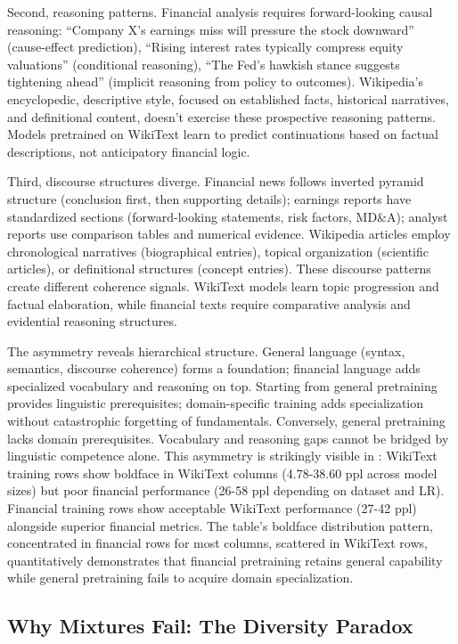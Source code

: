 Second, reasoning patterns. Financial analysis requires forward-looking causal reasoning: ``Company X's earnings miss will pressure the stock downward'' (cause-effect prediction), ``Rising interest rates typically compress equity valuations'' (conditional reasoning), ``The Fed's hawkish stance suggests tightening ahead'' (implicit reasoning from policy to outcomes). Wikipedia's encyclopedic, descriptive style, focused on established facts, historical narratives, and definitional content, doesn't exercise these prospective reasoning patterns. Models pretrained on WikiText learn to predict continuations based on factual descriptions, not anticipatory financial logic.

Third, discourse structures diverge. Financial news follows inverted pyramid structure (conclusion first, then supporting details); earnings reports have standardized sections (forward-looking statements, risk factors, MD\&A); analyst reports use comparison tables and numerical evidence. Wikipedia articles employ chronological narratives (biographical entries), topical organization (scientific articles), or definitional structures (concept entries). These discourse patterns create different coherence signals. WikiText models learn topic progression and factual elaboration, while financial texts require comparative analysis and evidential reasoning structures.

The asymmetry reveals hierarchical structure. General language (syntax, semantics, discourse coherence) forms a foundation; financial language adds specialized vocabulary and reasoning on top. Starting from general pretraining provides linguistic prerequisites; domain-specific training adds specialization without catastrophic forgetting of fundamentals. Conversely, general pretraining lacks domain prerequisites. Vocabulary and reasoning gaps cannot be bridged by linguistic competence alone. This asymmetry is strikingly visible in : WikiText training rows show boldface in WikiText columns (4.78-38.60 ppl across model sizes) but poor financial performance (26-58 ppl depending on dataset and LR). Financial training rows show acceptable WikiText performance (27-42 ppl) alongside superior financial metrics. The table's boldface distribution pattern, concentrated in financial rows for most columns, scattered in WikiText rows, quantitatively demonstrates that financial pretraining retains general capability while general pretraining fails to acquire domain specialization.

\subsection{Why Mixtures Fail: The Diversity Paradox}

